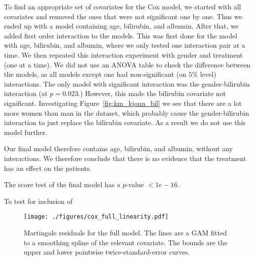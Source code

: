 \documentclass[11pt,a4paper]{article}
\begin{document}
To find an appropriate set of covariates for the Cox model, we started with all covariates and removed the ones that were not significant one by one. Thus we ended up with a model containing age, bilirubin, and albumin.
After that, we added first order interaction to the models. This was first done for the model with age, bilirubin, and albumin, where we only tested one interaction pair at a time. We then repeated this interaction experiment with gender and treatment (one at a time). We did not use an ANOVA table to check the difference between the models, as all models except one had non-significant (on $5\%$ level) interactions.
The only model with significant interaction was the gender-bilirubin interaction (at $p=0.023$.) However, this made the bilirubin covariate not significant. Investigating Figure~\ref{fig:km_kjonn_bil} we see that there are a lot more women than man in the dataset, which probably cause the gender-bilirubin interaction to just replace the bilirubin covariate. As a result we do not use this model further.

Our final model therefore contains age, bilirubin, and albumin, without any interactions. We therefore conclude that there is no evidence that the treatment has an effect on the patients.





The score test of the final model has a $p$-value $< 1e-16$.





To test for inclusion of 

\begin{figure}[h!tb]
    \begin{center}
        \texttt{[image: ./figures/cox\_full\_linearity.pdf]}
    \end{center}
    \vspace{-0.8cm}
    \caption{Martingale residuals for the full model. The lines are a GAM fitted to a smoothing spline of the relevant covariate. The bounds are the upper and lower pointwise twice-standard-error curves.}
    \label{fig:cox_full_linearity}
\end{figure}
\end{document}
